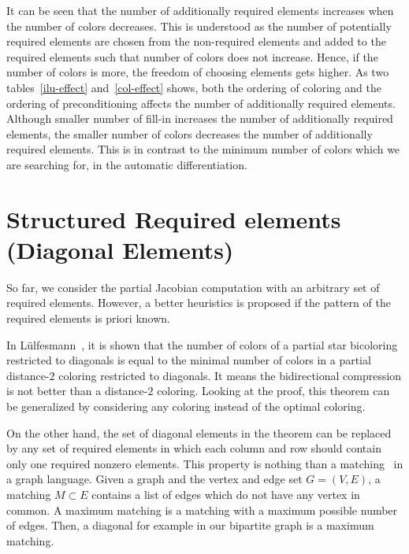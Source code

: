 \documentclass[12pt, twoside]{book}
\begin{document}
It can be seen that the number of additionally required elements increases when
the number of colors decreases. This is understood as the number of potentially
required elements are chosen from the non-required elements and added to the required elements
such that number of colors does not increase. Hence, if the number of colors is more,
the freedom of choosing elements gets higher.
As two tables~\ref{ilu-effect} and~\ref{col-effect} shows,
both the ordering of coloring and the ordering of preconditioning affects the number of
additionally required elements. Although smaller number of fill-in increases
the number of additionally required elements, the smaller number of colors
decreases the number of additionally required elements.
This is in contrast to the minimum number of colors which we are searching for,
in the automatic differentiation.

\section{Structured Required elements (Diagonal Elements)}
So far, we consider the partial Jacobian computation with an arbitrary
set of required elements. However, a better heuristics is proposed if the
pattern of the required elements is priori known.

In Lülfesmann~\cite{Lulfesmann2012Fap}, it is shown that the number of colors of
a partial star bicoloring restricted to diagonals is equal to
the minimal number of colors in a partial distance-$2$ coloring restricted
to diagonals. It means the bidirectional compression is not better than
a distance-$2$ coloring.
Looking at the proof, this theorem can be generalized by considering any
coloring instead of the optimal coloring.

On the other hand, the set of diagonal elements in the theorem
can be replaced by any set of required elements
in which each column and row should contain only one required nonzero elements.
This property is nothing than a matching~\cite{bondy2008graph} in a graph language.
Given a graph and the vertex and edge set $G=(V,E)$, a matching $M\subset E$ contains
a list of edges which do not have any vertex in common.
A maximum matching is a matching with a maximum possible number of edges.
Then, a diagonal for example in our bipartite graph is a maximum matching.
\end{document}
